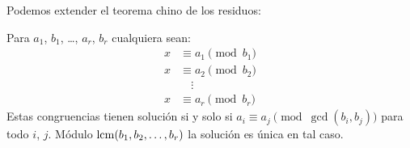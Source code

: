  Podemos extender el teorema chino de los residuos:
  \begin{theorem}
    \label{theo:chino-residuos-generalizado}
    Para \(a_1\), \(b_1\), \ldots, \(a_r\), \(b_r\) cualquiera
    sean:
    \begin{align*}
      x &\equiv a_1 \pmod{b_1} \\
      x &\equiv a_2 \pmod{b_2} \\
	&\quad \vdots	       \\
      x &\equiv a_r \pmod{b_r}
    \end{align*}
    Estas congruencias tienen solución si y solo si
    \(a_i \equiv a_j \pmod{\gcd(b_i, b_j)}\) para todo \(i\), \(j\).
    Módulo \(\operatorname{lcm}(b_1, b_2, \dotsc, b_r)\)
    la solución es única en tal caso.
  \end{theorem}
